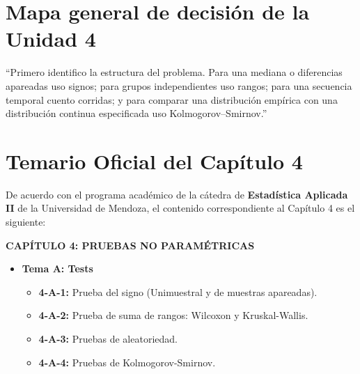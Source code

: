 \documentclass[11pt,a4paper]{article}
\begin{document}
\section{Mapa general de decisión de la Unidad 4}
\begin{center}
\end{center}
\begin{guion}[title=Lectura rápida del mapa]
``Primero identifico la estructura del problema. Para una mediana o diferencias apareadas uso signos; para grupos independientes uso rangos; para una secuencia temporal cuento corridas; y para comparar una distribución empírica con una distribución continua especificada uso Kolmogorov--Smirnov.''
\end{guion}

\section{Temario Oficial del Capítulo 4}
De acuerdo con el programa académico de la cátedra de \textbf{Estadística Aplicada II} de la Universidad de Mendoza, el contenido correspondiente al Capítulo 4 es el siguiente:

\begin{tcolorbox}[colback=gray!5!white,colframe=gray!50!black,title=Estructura Programática]
    \textbf{CAPÍTULO 4: PRUEBAS NO PARAMÉTRICAS}
    \begin{itemize}
        \item \textbf{Tema A: Tests}
        \begin{itemize}
            \item \textbf{4-A-1:} Prueba del signo (Unimuestral y de muestras apareadas).
            \item \textbf{4-A-2:} Prueba de suma de rangos: Wilcoxon y Kruskal-Wallis.
            \item \textbf{4-A-3:} Pruebas de aleatoriedad.
            \item \textbf{4-A-4:} Pruebas de Kolmogorov-Smirnov.
        \end{itemize}
    \end{itemize}
\end{tcolorbox}
\end{document}
